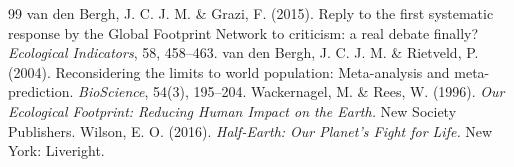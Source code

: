\begin{thebibliography}{99}
 van den Bergh, J. C. J. M. \& Grazi, F. (2015). Reply to the first systematic response by the Global Footprint Network to criticism: a real debate finally? \emph{Ecological Indicators}, 58, 458--463.
 van den Bergh, J. C. J. M. \& Rietveld, P. (2004). Reconsidering the limits to world population: Meta-analysis and meta-prediction. \emph{BioScience}, 54(3), 195--204.
 Wackernagel, M. \& Rees, W. (1996). \emph{Our Ecological Footprint: Reducing Human Impact on the Earth.} New Society Publishers.
 Wilson, E. O. (2016). \emph{Half-Earth: Our Planet's Fight for Life.} New York: Liveright.
\end{thebibliography}


